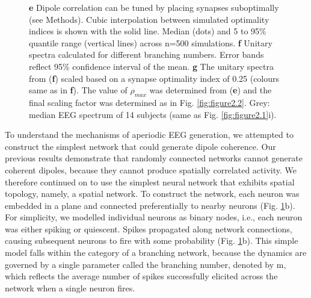 \begin{figure}[t!]
{\begin{minipage}[c]{180mm}
{	\textbf{e} Dipole correlation can be tuned by placing synapses suboptimally (see Methods). Cubic interpolation between simulated optimality indices is shown with the solid line. Median (dots) and 5 to 95\% quantile range (vertical lines) across n=500 simulations.
	\textbf{f} Unitary spectra calculated for different branching numbers. Error bands reflect 95\% confidence interval of the mean.
	\textbf{g} The unitary spectra from (\textbf{f}) scaled based on a synapse optimality index of 0.25 (colours same as in \textbf{f}). The value of $\rho_{max}$ was determined from (\textbf{e}) and the final scaling factor was determined as in Fig. \ref{fig:figure2.2}. Grey: median EEG spectrum of 14 subjects (same as Fig. \ref{fig:figure2.1}i).} 
    \label{fig:figure2.4}
    \end{minipage}
    }
\end{figure}


To understand the mechanisms of aperiodic EEG generation, we attempted to construct the simplest network that could generate dipole coherence. Our previous results demonstrate that randomly connected networks cannot generate coherent dipoles, because they cannot produce spatially correlated activity. We therefore continued on to use the simplest neural network that exhibits spatial topology, namely, a spatial network. To construct the network, each neuron was embedded in a plane and connected preferentially to nearby neurons (Fig. \ref{fig:figure2.4}b). For simplicity, we modelled individual neurons as binary nodes, i.e., each neuron was either spiking or quiescent. Spikes propagated along network connections, causing subsequent neurons to fire with some probability (Fig. \ref{fig:figure2.4}b). This simple model falls within the category of a branching network, because the dynamics are governed by a single parameter called the branching number, denoted by m, which reflects the average number of spikes successfully elicited across the network when a single neuron fires. 

